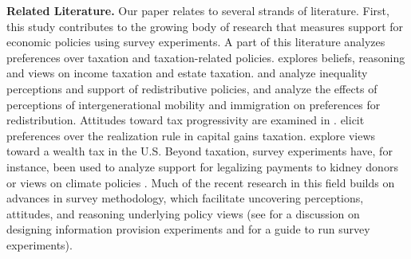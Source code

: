\documentclass[12pt]{article}
\begin{document}


\textbf{Related Literature.}
Our paper relates to several strands of literature. First, this study contributes to the growing body of research that measures support for economic policies using survey experiments. A part of this literature analyzes preferences over taxation and taxation-related policies. \textcite{stantcheva2021understanding} explores beliefs, reasoning and views on income taxation and estate taxation. \textcite{cruces2013biased} and \textcite{kuziemko2015elastic} analyze inequality perceptions and support of redistributive policies, \textcite{alesina2018intergenerational} and \textcite{alesina2023immigration} analyze the effects of perceptions of intergenerational mobility and immigration on preferences for redistribution. Attitudes toward tax progressivity are examined in \textcite{tarroux2019value}. \textcite{liscow2022psychology} elicit preferences over the realization rule in capital gains taxation. \textcite{fisman2020americans} explore views toward a wealth tax in the U.S. Beyond taxation, survey experiments have, for instance, been used to analyze support for legalizing payments to kidney donors \parencite{elias2019paying} or views on climate policies \parencite{dechezlepretre2025fighting}. Much of the recent research in this field builds on advances in survey methodology, which facilitate uncovering perceptions, attitudes, and reasoning underlying policy views (see \textcite{haaland2023designing} for a discussion on designing information provision experiments and \textcite{stantcheva2023run} for a guide to run survey experiments). 
\end{document}
